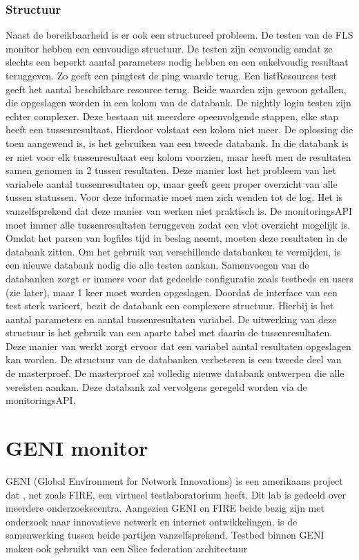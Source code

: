 \subsubsection{Structuur}
\npar
Naast de bereikbaarheid is er ook een structureel probleem. De testen van de FLS monitor hebben een eenvoudige structuur. De testen zijn eenvoudig omdat ze slechts een beperkt aantal parameters nodig hebben en een enkelvoudig resultaat teruggeven. Zo geeft een pingtest de ping waarde terug. Een listResources test geeft het aantal beschikbare resource terug. Beide waarden zijn gewoon getallen, die opgeslagen worden in een kolom van de databank.
\npar
De nightly login testen zijn echter complexer. Deze bestaan uit meerdere opeenvolgende stappen, elke stap heeft een tussenresultaat. Hierdoor volstaat een kolom niet meer. De oplossing die toen aangewend is, is het gebruiken van een tweede databank. In die databank is er niet voor elk tussenresultaat een kolom voorzien, maar heeft men de resultaten samen genomen in 2 tussen resultaten. Deze manier lost het probleem van het variabele aantal tussenresultaten op, maar geeft geen proper overzicht van alle tussen statussen. Voor deze informatie moet men zich wenden tot de log.
\clearpage
\npar
Het is vanzelfsprekend dat deze manier van werken niet praktisch is. De monitoringsAPI moet immer alle tussenresultaten teruggeven zodat een vlot overzicht mogelijk is. Omdat het parsen van logfiles tijd in beslag neemt, moeten deze resultaten in de databank zitten. Om het gebruik van verschillende databanken te vermijden, is een nieuwe databank nodig die alle testen aankan. Samenvoegen van de databanken zorgt er immers voor dat gedeelde configuratie zoals testbeds en users (zie later), maar 1 keer moet worden opgeslagen.
\npar
Doordat de interface van een test sterk varieert, bezit de databank een complexere structuur. Hierbij is het aantal parameters en aantal tussenresultaten variabel. De uitwerking van deze structuur is het gebruik van een aparte tabel met daarin de tussenresultaten. Deze manier van werkt zorgt ervoor dat een variabel aantal resultaten opgeslagen kan worden.
\npar
De structuur van de databanken verbeteren is een tweede deel van de masterproef. De masterproef zal volledig nieuwe databank ontwerpen die alle vereisten aankan. Deze databank zal vervolgens geregeld worden via de monitoringsAPI.
\clearpage
\section{GENI monitor}
\npar
GENI (Global Environment for Network Innovations) is een amerikaans project dat , net zoals FIRE, een virtueel testlaboratorium heeft. Dit lab is gedeeld over meerdere onderzoekscentra. Aangezien GENI en FIRE beide bezig zijn met onderzoek naar innovatieve netwerk en internet ontwikkelingen, is de samenwerking tussen beide partijen vanzelfsprekend.
\npar
Testbed binnen GENI maken ook gebruikt van een Slice federation architectuur

